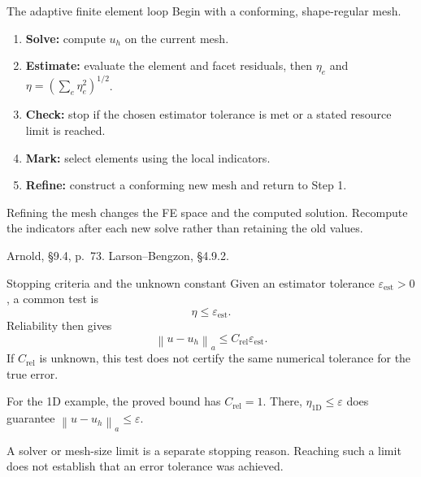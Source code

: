 \documentclass[11pt,aspectratio=169]{beamer}
\newcommand{\norm}[2][]{\left\lVert#2\right\rVert_{#1}}
\begin{document}
\begin{frame}{The adaptive finite element loop}
Begin with a conforming, shape-regular mesh.
\begin{enumerate}
 \item \textbf{Solve:} compute $u_h$ on the current mesh.
 \item \textbf{Estimate:} evaluate the element and facet residuals, then
 $\eta_e$ and $\eta=(\sum_e\eta_e^2)^{1/2}$.
 \item \textbf{Check:} stop if the chosen estimator tolerance is met or
 a stated resource limit is reached.
 \item \textbf{Mark:} select elements using the local indicators.
 \item \textbf{Refine:} construct a conforming new mesh and return to Step 1.
\end{enumerate}
Refining the mesh changes the FE space and the computed solution. Recompute
the indicators after each new solve rather than retaining the old values.

\vspace{0.15cm}
{\footnotesize Arnold, \S9.4, p.~73. Larson--Bengzon, \S4.9.2.}
\end{frame}

\begin{frame}{Stopping criteria and the unknown constant}
Given an estimator tolerance $\varepsilon_{\mathrm{est}}>0$, a common test is
\[
 \eta\leq\varepsilon_{\mathrm{est}}.
\]
Reliability then gives
\[
 \norm[a]{u-u_h}\leq C_{\mathrm{rel}}\varepsilon_{\mathrm{est}}.
\]
If $C_{\mathrm{rel}}$ is unknown, this test does not certify the same numerical
tolerance for the true error.

For the 1D example, the proved bound has $C_{\mathrm{rel}}=1$. There,
$\eta_{\mathrm{1D}}\leq\varepsilon$ does guarantee
$\norm[a]{u-u_h}\leq\varepsilon$.

A solver or mesh-size limit is a separate stopping reason. Reaching such a
limit does not establish that an error tolerance was achieved.
\end{frame}
\end{document}
